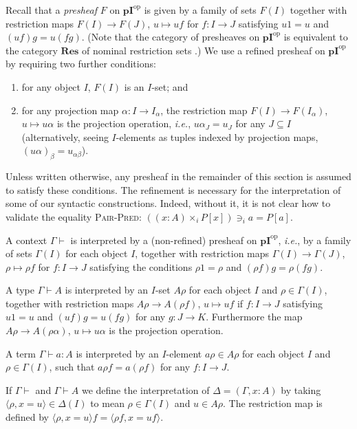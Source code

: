 \documentclass[english]{PaperTools/latex/entcs}
\theoremstyle{plain}
\theoremstyle{definition}
\theoremstyle{remark}
\newcommand\CTimes[2]{(#2) ×_{#1}}
\newcommand\op[1]{∋_{#1}}
\def\pI{\ensuremath{\mathbf{pI}}}
\def\ie{\textit{i.e.}}
\def\opp{\mathrm{op}}
\begin{document}
Recall that a \emph{presheaf} $F$ on $\pI^\opp$ is given by a family of
sets $F(I)$ together with restriction maps $F(I) → F(J)$, $u ↦ uf$ for
$f : I → J$ satisfying $u1 = u$ and $(uf)g = u(fg)$.
(Note that the category of presheaves on $\pI^\opp$ is equivalent to the
category $\mathbf{Res}$ of nominal restriction sets
\cite[rem.~9.9 p.~161]{PittsAM:nomsns}.)
%
We use a refined presheaf on $\pI^\opp$ by requiring two further conditions:
%
\begin{enumerate}
  \item for any object $I$, $F(I)$ is an $I$-set; and
    \label{itm:presheaf-refinement-1}
  \item for any projection map $α : I → I_α$, the restriction
    map $F(I) → F(I_α)$, $u ↦ uα$ is the projection operation, \ie,
    $uα_J = u_J$ for any $J ⊆ I$
    (alternatively, seeing $I$-elements as tuples indexed by projection
    maps, $(uα)_β = u_{αβ}$).
    \label{itm:presheaf-refinement-2}
\end{enumerate}
Unless written otherwise, any presheaf in the remainder of this section
is assumed to satisfy these conditions.
The refinement is necessary for the interpretation of some of our
syntactic constructions.  Indeed, without it, it is not clear how to
validate the equality \textsc{Pair-Pred}:
${{(\CTimes i {x:A} P[x])} \op i a = P[a]}$.

\medskip
A context $Γ ⊢$ is interpreted by a (non-refined) presheaf on $\pI^\opp$, \ie,
by a family of sets $Γ(I)$ for each object $I$, together with
restriction maps $Γ(I) → Γ(J)$, $ρ ↦ ρf$ for $f : I → J$ satisfying the
conditions $ρ1 = ρ$ and $(ρf)g = ρ(fg)$.

A type $Γ ⊢ A$ is interpreted by an $I$-set $Aρ$ for each object $I$ and
$ρ ∈ Γ(I)$,
together with restriction maps $Aρ → A(ρf)$, $u ↦ uf$ if $f : I → J$
satisfying $u1 = u$ and $(uf)g = u(fg)$ for any $g : J → K$.
Furthermore the map $Aρ → A(ρα)$, $u ↦ uα$ is the projection operation.

A term $Γ ⊢ a : A$ is interpreted by an $I$-element $aρ ∈ Aρ$ for each
object $I$ and $ρ ∈ Γ(I)$, such that $aρf = a(ρf)$ for any $f : I → J$.

If $Γ⊢$ and $Γ ⊢ A$ we define the interpretation of $Δ = (Γ,x:A)$
by taking $⟨ρ,x=u⟩ ∈ Δ(I)$ to mean $ρ ∈ Γ(I)$ and $u ∈ Aρ$.
The restriction map is defined by $⟨ρ,x=u⟩f = ⟨ρf, x=uf⟩$.
\end{document}
